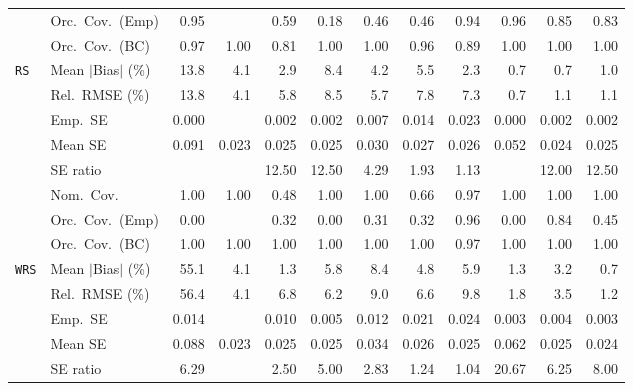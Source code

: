 \begin{landscape}
\begin{longtable}{llrrrrrrrrrr}
 & Orc.\ Cov.\ (Emp) & \cellcolor{rankone}0.95 &  & 0.59 & 0.18 & 0.46 & 0.46 & \cellcolor{rankthree}0.94 & \cellcolor{ranktwo}0.96 & 0.85 & 0.83 \\
 & Orc.\ Cov.\ (BC) & \cellcolor{ranktwo}0.97 & 1.00 & 0.81 & 1.00 & \cellcolor{rankthree}1.00 & \cellcolor{rankone}0.96 & 0.89 & 1.00 & 1.00 & 1.00 \\
\addlinespace[2pt]
\quad \texttt{RS} & Mean $|$Bias$|$ (\%) & 13.8 & 4.1 & 2.9 & 8.4 & 4.2 & 5.5 & 2.3 & \cellcolor{rankone}0.7 & \cellcolor{ranktwo}0.7 & \cellcolor{rankthree}1.0 \\
 & Rel.\ RMSE (\%) & 13.8 & 4.1 & 5.8 & 8.5 & 5.7 & 7.8 & 7.3 & \cellcolor{rankone}0.7 & \cellcolor{ranktwo}1.1 & \cellcolor{rankthree}1.1 \\
 & Emp.\ SE & 0.000 &  & 0.002 & 0.002 & 0.007 & 0.014 & 0.023 & 0.000 & 0.002 & 0.002 \\
 & Mean SE & 0.091 & 0.023 & 0.025 & 0.025 & 0.030 & 0.027 & 0.026 & 0.052 & 0.024 & 0.025 \\
 & SE ratio &  &  & 12.50 & 12.50 & \cellcolor{rankthree}4.29 & \cellcolor{ranktwo}1.93 & \cellcolor{rankone}1.13 &  & 12.00 & 12.50 \\
 & Nom.\ Cov. & \cellcolor{rankthree}1.00 & 1.00 & 0.48 & \cellcolor{ranktwo}1.00 & 1.00 & 0.66 & \cellcolor{rankone}0.97 & 1.00 & 1.00 & 1.00 \\
 & Orc.\ Cov.\ (Emp) & 0.00 &  & 0.32 & 0.00 & 0.31 & 0.32 & \cellcolor{rankone}0.96 & 0.00 & \cellcolor{ranktwo}0.84 & \cellcolor{rankthree}0.45 \\
 & Orc.\ Cov.\ (BC) & \cellcolor{rankthree}1.00 & 1.00 & 1.00 & 1.00 & 1.00 & \cellcolor{ranktwo}1.00 & \cellcolor{rankone}0.97 & 1.00 & 1.00 & 1.00 \\
\addlinespace[2pt]
\quad \texttt{WRS} & Mean $|$Bias$|$ (\%) & 55.1 & 4.1 & \cellcolor{ranktwo}1.3 & 5.8 & 8.4 & 4.8 & 5.9 & \cellcolor{rankthree}1.3 & 3.2 & \cellcolor{rankone}0.7 \\
 & Rel.\ RMSE (\%) & 56.4 & 4.1 & 6.8 & 6.2 & 9.0 & 6.6 & 9.8 & \cellcolor{ranktwo}1.8 & \cellcolor{rankthree}3.5 & \cellcolor{rankone}1.2 \\
 & Emp.\ SE & 0.014 &  & 0.010 & 0.005 & 0.012 & 0.021 & 0.024 & 0.003 & 0.004 & 0.003 \\
 & Mean SE & 0.088 & 0.023 & 0.025 & 0.025 & 0.034 & 0.026 & 0.025 & 0.062 & 0.025 & 0.024 \\
 & SE ratio & 6.29 &  & \cellcolor{rankthree}2.50 & 5.00 & 2.83 & \cellcolor{ranktwo}1.24 & \cellcolor{rankone}1.04 & 20.67 & 6.25 & 8.00 \\

\end{longtable}
\end{landscape}
